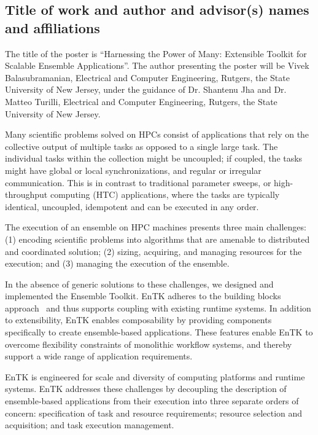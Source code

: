 \subsection{Title of work and author and advisor(s) names and affiliations}

The title of the poster is ``Harnessing the Power of Many: Extensible Toolkit 
for Scalable Ensemble Applications''. The author presenting the poster will be 
Vivek Balasubramanian, Electrical and Computer Engineering, Rutgers, the State 
University of New Jersey, under the guidance of Dr. Shantenu Jha and Dr. Matteo
Turilli, Electrical and Computer Engineering, Rutgers, the State University of 
New Jersey.


Many scientific problems solved on HPCs consist of applications that rely on the
collective output of multiple tasks as opposed to a single large task. The 
individual tasks within the collection might be uncoupled; if coupled, the tasks
might have global or local synchronizations, and regular or irregular 
communication. This is in contrast to traditional parameter sweeps, or 
high-throughput computing (HTC) applications, where the tasks are typically
identical, uncoupled, idempotent and can be executed in any order.

The execution of an ensemble on HPC machines presents three main challenges: 
(1) encoding scientific problems into algorithms that are amenable to 
distributed and coordinated solution; (2) sizing, acquiring, and managing 
resources for the execution; and (3) managing the execution of the ensemble.

In the absence of generic solutions to these challenges, we designed and 
implemented the Ensemble Toolkit. EnTK adheres to the building blocks 
approach~\cite{} and thus supports coupling with existing runtime systems. 
In addition to extensibility, EnTK enables composability by providing components
specifically to create ensemble-based applications. These features enable EnTK
to overcome flexibility constraints of monolithic workflow systems, and thereby 
support a wide range of application requirements.

EnTK is engineered for scale and diversity of computing platforms and runtime 
systems. EnTK addresses these challenges by decoupling the description of 
ensemble-based applications from their execution into three separate orders of 
concern: specification of task and resource requirements; resource selection and
acquisition; and task execution management.

